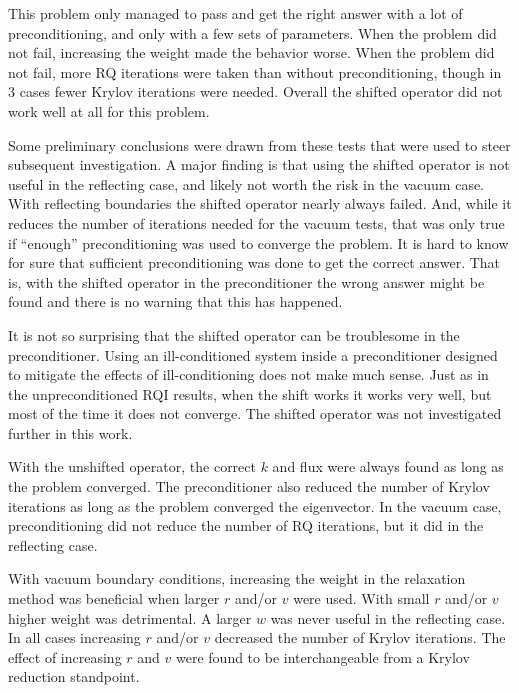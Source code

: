 This problem only managed to pass and get the right answer with a lot of preconditioning, and only with a few sets of parameters. When the problem did not fail, increasing the weight made the behavior worse. When the problem did not fail, more RQ iterations were taken than without preconditioning, though in 3 cases fewer Krylov iterations were needed. Overall the shifted operator did not work well at all for this problem.

Some preliminary conclusions were drawn from these tests that were used to steer subsequent investigation. A major finding is that using the shifted operator is not useful in the reflecting case, and likely not worth the risk in the vacuum case. With reflecting boundaries the shifted operator nearly always failed. And, while it reduces the number of iterations needed for the vacuum tests, that was only true if ``enough'' preconditioning was used to converge the problem. It is hard to know for sure that sufficient preconditioning was done to get the correct answer. That is, with the shifted operator in the preconditioner the wrong answer might be found and there is no warning that this has happened. 

It is not so surprising that the shifted operator can be troublesome in the preconditioner. Using an ill-conditioned system inside a preconditioner designed to mitigate the effects of ill-conditioning does not make much sense. Just as in the unpreconditioned RQI results, when the shift works it works very well, but most of the time it does not converge. The shifted operator was not investigated further in this work.

With the unshifted operator, the correct $k$ and flux were always found as long as the problem converged. The preconditioner also reduced the number of Krylov iterations as long as the problem converged the eigenvector. In the vacuum case, preconditioning did not reduce the number of RQ iterations, but it did in the reflecting case. 

With vacuum boundary conditions, increasing the weight in the relaxation method was beneficial when larger $r$ and/or $v$ were used. With small $r$ and/or $v$ higher weight was detrimental. A larger $w$ was never useful in the reflecting case. In all cases increasing $r$ and/or $v$ decreased the number of Krylov iterations. The effect of increasing $r$ and $v$ were found to be interchangeable from a Krylov reduction standpoint. 

